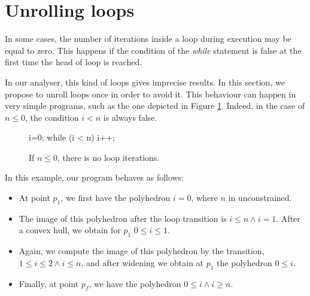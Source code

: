 \documentclass[a4paper,english,titlepage,11pt]{report}
\begin{document}
\section{Unrolling loops}

In some cases, the number of iterations inside a loop during execution 
may be equal to zero. This happens if the condition of the \emph{while}
statement is false at the first time the head of loop is reached.

In our analyser, this kind of loops gives imprecise results. In this section, we
propose to unroll loops once in order to avoid it.
This behaviour can happen in very simple programs, such as the one
depicted in Figure \ref{loop}. Indeed, in the case of $n \leq 0$, the condition
$i < n$ is always false.

\begin{figure}[!h]
\begin{minipage}[c]{.29\linewidth}
\begin{C}
i=0;
while (i < n)
	i++;
\end{C}
\end{minipage}
\begin{minipage}[c]{.69\linewidth}
\centering
{}
\end{minipage}
\caption{If $n \leq 0$, there is no loop iterations.}
\label{loop}
\end{figure}

In this example, our program behaves as follows:
\begin{itemize}
\item At point $p_1$, we first have the polyhedron $i=0$, where $n$ in
unconstrained.
\item The image of this polyhedron after the loop transition is $i \leq n \wedge
i=1$. After a convex hull, we obtain for $p_1$ $0 \leq i \leq 1$.
\item Again, we
compute the image of this polyhedron by the transition, $1 \leq i \leq 2 \wedge
i \leq n$, and after widening we
obtain at $p_1$ the polyhedron $0 \leq i$.
\item Finally, at point $p_f$, we have the polyhedron $0 \leq i \wedge i \geq
n$.
\end{itemize}
\end{document}
